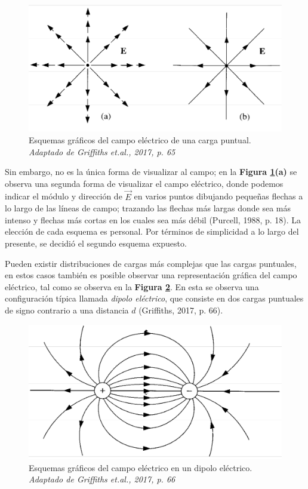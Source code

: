 \documentclass[letterpaper, 11 pt]{article}
\begin{document}
\begin{multicols}{2}
\begin{figure}[H]
\includegraphics[scale=0.3]{Modelos.png}
\centering
\captionsetup{justification=centering,margin=0.5cm}
\caption{Esquemas gráficos del campo eléctrico de una carga puntual. \textit{Adaptado de Griffiths et.al., 2017, p. 65}}
\label{modelo}
\end{figure}

Sin embargo, no es la única forma de visualizar al campo; en la \textbf{Figura \ref{modelo}(a)} se observa una segunda forma de visualizar el campo eléctrico, donde podemos indicar el módulo y dirección de $\vec{E}$ en varios puntos dibujando pequeñas flechas a lo largo de las líneas de campo; trazando las flechas más largas donde sea más intenso y flechas más cortas en los cuales sea más débil (Purcell, 1988, p. 18). La elección de cada esquema es personal. Por términos  de simplicidad a lo largo del presente, se decidió el segundo esquema expuesto.

Pueden existir distribuciones de cargas más complejas que las cargas puntuales, en estos casos también es posible observar una representación gráfica del campo eléctrico, tal como se observa en la \textbf{Figura \ref{di}}. En esta se observa una configuración típica llamada \textit{dipolo eléctrico}, que consiste en dos cargas puntuales de signo contrario a una distancia $d$ (Griffiths, 2017, p. 66).

\begin{figure}[H]
\includegraphics[scale=0.4]{dipolos.png}
\centering
\captionsetup{justification=centering,margin=0.5cm}
\caption{Esquemas gráficos del campo eléctrico en un dipolo eléctrico. \textit{Adaptado de Griffiths et.al., 2017, p. 66}}
\label{di}
\end{figure}


\end{multicols}
\end{document}
